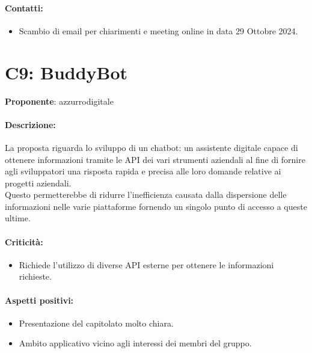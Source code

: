 \documentclass{TWDocumentFull}
\begin{document}
    \paragraph{Contatti:}
    \begin{itemize}
        \item Scambio di email per chiarimenti  e meeting online in data 29 Ottobre 2024.
    \end{itemize}

    \section*{C9: BuddyBot}
    {\textbf{Proponente}: azzurrodigitale}
    \paragraph{Descrizione:\\}
    {La proposta riguarda lo sviluppo di un chatbot: un assistente digitale capace di ottenere informazioni tramite le API dei vari strumenti aziendali al fine di fornire agli sviluppatori una risposta rapida e precisa alle loro domande relative ai progetti aziendali.\\Questo permetterebbe di ridurre l'inefficienza causata dalla dispersione delle informazioni nelle varie piattaforme fornendo un singolo punto di accesso a queste ultime.}
    \paragraph{Criticità:}
    \begin{itemize}
        \item Richiede l'utilizzo di diverse API esterne per ottenere le informazioni richieste.
    \end{itemize}
    \paragraph{Aspetti positivi:}
    \begin{itemize}
        \item Presentazione del capitolato molto chiara.
        \item Ambito applicativo vicino agli interessi dei membri del gruppo.
    \end{itemize}
\end{document}
